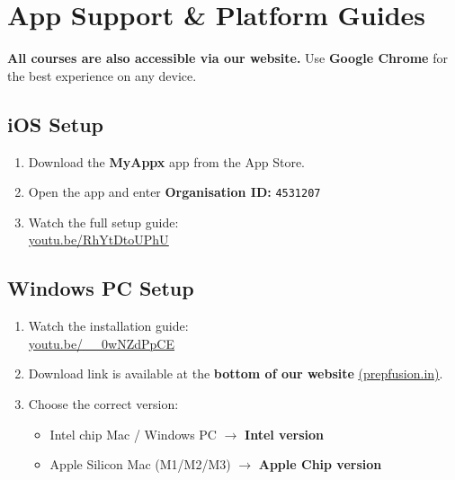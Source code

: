 \documentclass[12pt, a4paper]{article}
\newcommand{\pflink}[2]{\href{#1}{\textcolor{pfTeal}{\underline{#2}}}}
\begin{document}
\section{App Support \& Platform Guides}

\begin{notebox}
  \small\faInfoCircle\enspace
  \textbf{All courses are also accessible via our website.}
  Use \textbf{Google Chrome} for the best experience on any device.
\end{notebox}

\subsection{\faApple\enspace iOS Setup}

\begin{stepbox}
  \small
  \begin{enumerate}
    \item Download the \textbf{MyAppx} app from the App Store.
    \item Open the app and enter \textbf{Organisation ID:} \texttt{4531207}
    \item Watch the full setup guide:\\
          \pflink{https://youtu.be/RhYtDtoUPhU?si=n_66JpMqoDp1b5gn}%
                 {youtu.be/RhYtDtoUPhU}
  \end{enumerate}
\end{stepbox}

\subsection{\faWindows\enspace Windows PC Setup}

\begin{stepbox}
  \small
  \begin{enumerate}
    \item Watch the installation guide:\\
          \pflink{https://youtu.be/__0wNZdPpCE?si=SPlTD77EM-52Hhji}%
                 {youtu.be/\_\_0wNZdPpCE}
    \item Download link is available at the \textbf{bottom of our website}
          \pflink{https://prepfusion.in}{(prepfusion.in)}.
    \item Choose the correct version:
          \begin{itemize}
            \item Intel chip Mac / Windows PC $\to$ \textbf{Intel version}
            \item Apple Silicon Mac (M1/M2/M3) $\to$ \textbf{Apple Chip version}
          \end{itemize}
  \end{enumerate}
\end{stepbox}
\end{document}
